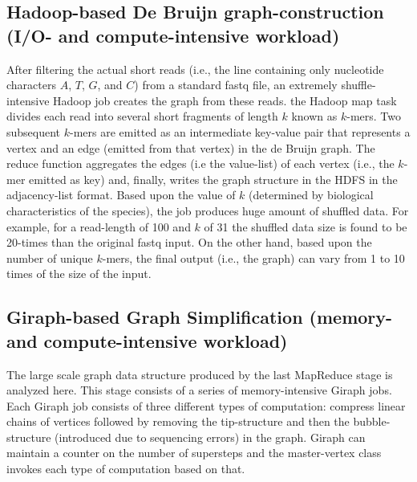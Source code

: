 \documentclass[journal]{IEEEtran}
\begin{document}
\subsection{Hadoop-based De Bruijn graph-construction (I/O- and compute-intensive workload)}
After filtering the actual short reads (i.e., the line containing only nucleotide characters $A$, $T$, $G$, and $C$) from a standard fastq file, an extremely shuffle-intensive Hadoop job creates the graph from these reads.  the Hadoop map task divides each read into several short fragments of length $k$ known as $k$-mers. Two subsequent $k$-mers are emitted as an intermediate key-value pair that represents  a vertex and an edge (emitted from that vertex) in the de Bruijn graph.  The reduce function aggregates the edges (i.e the value-list) of each vertex (i.e., the $k$-mer emitted as key) and, finally, writes the graph structure in the HDFS in the adjacency-list format. Based upon the value of $k$ (determined by biological characteristics of the species), the job produces huge amount of shuffled data. For example, for a read-length of 100 and $k$ of 31 the shuffled data size is found to be 20-times than the original fastq input. On the other hand, based upon the number of unique $k$-mers, the final output (i.e., the graph) can vary from 1 to 10 times of the size of the input. 

\subsection{Giraph-based Graph Simplification (memory- and compute-intensive workload)}
The large scale graph data structure produced by the last MapReduce stage is analyzed here. This stage consists of a series of memory-intensive Giraph jobs. Each Giraph job consists of three different types of computation: compress linear chains of vertices followed by removing the tip-structure and then the bubble-structure (introduced due to sequencing errors) in the graph. Giraph can maintain a counter on the number of supersteps and the master-vertex class invokes each type of computation based on that.

\end{document}
